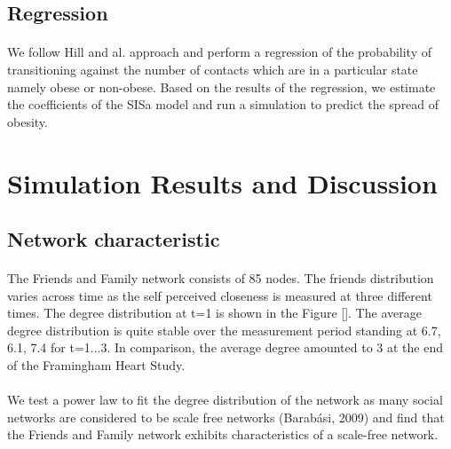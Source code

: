 \documentclass[11pt]{article}
\begin{document}
\subsection{Regression}
\paragraph{}
We follow Hill and al. approach and perform a regression of the probability of transitioning against the number of contacts which are in a particular state namely obese or non-obese. Based on the results of the regression, we estimate the coefficients of the SISa model and run a simulation to predict the spread of obesity.

\section{Simulation Results and Discussion}

\subsection{Network characteristic}
\paragraph{}
The Friends and Family network consists of 85 nodes. The friends distribution varies across time as the self perceived closeness is measured at three different times. The degree distribution at t=1 is shown in the Figure []. The average degree distribution is quite stable over the measurement period standing at 6.7, 6.1, 7.4 for t=1...3. In comparison, the average degree amounted to 3 at the end of the Framingham Heart Study.

\paragraph{}
We test a power law to fit the degree distribution of the network as many social networks are considered to be scale free networks (Barabási, 2009) and find that the Friends and Family network exhibits characteristics of a scale-free network.
\end{document}
